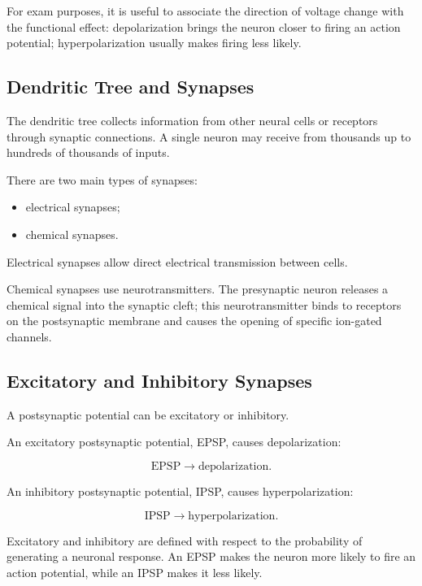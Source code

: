 \begin{authornote}
For exam purposes, it is useful to associate the direction of voltage change with the functional effect: depolarization brings the neuron closer to firing an action potential; hyperpolarization usually makes firing less likely.
\end{authornote}

\subsection{Dendritic Tree and Synapses}

The dendritic tree collects information from other neural cells or receptors through synaptic connections. A single neuron may receive from thousands up to hundreds of thousands of inputs.

There are two main types of synapses:

\begin{itemize}[noitemsep]
    \item electrical synapses;
    \item chemical synapses.
\end{itemize}

Electrical synapses allow direct electrical transmission between cells.

Chemical synapses use neurotransmitters. The presynaptic neuron releases a chemical signal into the synaptic cleft; this neurotransmitter binds to receptors on the postsynaptic membrane and causes the opening of specific ion-gated channels.

\subsection{Excitatory and Inhibitory Synapses}

A postsynaptic potential can be excitatory or inhibitory.

An excitatory postsynaptic potential, EPSP, causes depolarization:

\[
\text{EPSP} \rightarrow \text{depolarization}.
\]

An inhibitory postsynaptic potential, IPSP, causes hyperpolarization:

\[
\text{IPSP} \rightarrow \text{hyperpolarization}.
\]

Excitatory and inhibitory are defined with respect to the probability of generating a neuronal response. An EPSP makes the neuron more likely to fire an action potential, while an IPSP makes it less likely.

